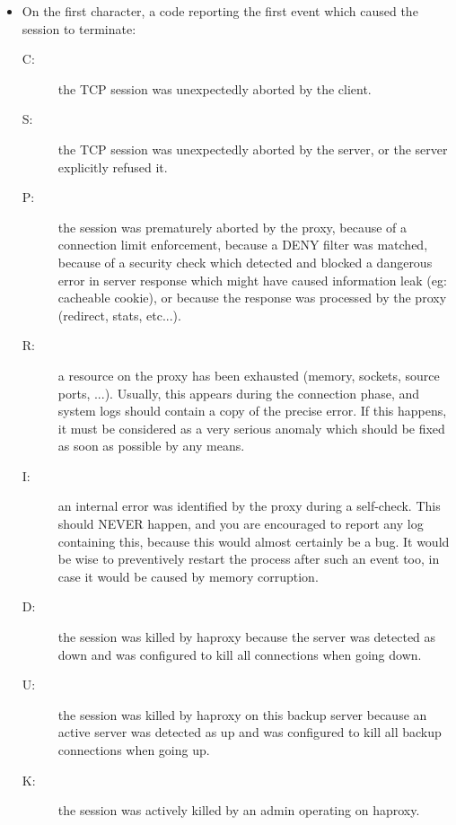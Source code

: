 \begin{itemize}
\item
    On the first character, a code reporting the first event which caused the
    session to terminate:
    
    \begin{description}
    \item[C:]
            the TCP session was unexpectedly aborted by the client.
    \item[S:]
            the TCP session was unexpectedly aborted by the server, or the
            server explicitly refused it.
    \item[P:]
            the session was prematurely aborted by the proxy, because of a
            connection limit enforcement, because a DENY filter was matched,
            because of a security check which detected and blocked a dangerous
            error in server response which might have caused information leak
            (eg: cacheable cookie), or because the response was processed by
            the proxy (redirect, stats, etc...).
    \item[R:]
            a resource on the proxy has been exhausted (memory, sockets, source
            ports, ...). Usually, this appears during the connection phase, and
            system logs should contain a copy of the precise error. If this
            happens, it must be considered as a very serious anomaly which
            should be fixed as soon as possible by any means.
    \item[I:]
            an internal error was identified by the proxy during a self-check.
            This should NEVER happen, and you are encouraged to report any log
            containing this, because this would almost certainly be a bug. It
            would be wise to preventively restart the process after such an
            event too, in case it would be caused by memory corruption.
    \item[D:]
            the session was killed by haproxy because the server was detected
            as down and was configured to kill all connections when going down.
    \item[U:]
            the session was killed by haproxy on this backup server because an
            active server was detected as up and was configured to kill all
            backup connections when going up.
    \item[K:]
            the session was actively killed by an admin operating on haproxy.


\end{description}
\end{itemize}
